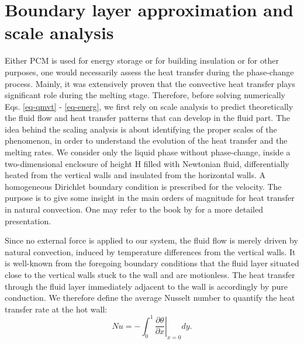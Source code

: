 \section{Boundary layer approximation and scale analysis} \label{sec-bound-scal-anal}
Either PCM is used for energy storage or for building insulation or for other purposes, one would necessarily assess the heat transfer during the phase-change process.
Mainly, it was extensively proven that the convective heat transfer plays significant role during the melting stage.
Therefore, before solving numerically Eqs. \ref{eq-qmvt} - \ref{eq-energ}, we first rely on scale analysis to predict theoretically the fluid flow and heat transfer patterns that can develop in the fluid part.
The idea behind the scaling analysis is about identifying the proper scales of the phenomenon, in order to understand the evolution of the heat transfer and the melting rates.
We consider only the liquid phase without phase-change, inside a two-dimensional enclosure of height H filled with Newtonian fluid, differentially heated from the vertical walls and insulated from the horizontal walls.
A homogeneous Dirichlet boundary condition is prescribed for the velocity. 
The purpose is to give some insight in the main orders of magnitude for heat transfer in natural convection.
One may refer to the book by \cite{bejan2013convection} for a more detailed presentation.

Since no external force is applied to our system, the fluid flow is merely driven by natural convection, induced by temperature differences from the vertical walls.
It is well-known from the foregoing boundary conditions that the fluid layer situated close to the vertical walls stuck to the wall and are motionless.
The heat transfer through the fluid layer immediately adjacent to the wall is accordingly by pure conduction.
We therefore define the average Nusselt number to quantify the heat transfer rate at the hot wall:
\begin{equation}\label{eq-def-Nu}
   N\!u = - \int_0^1 \left. \frac{\partial \theta}{\partial x} \right |_{x=0} dy.
\end{equation}

